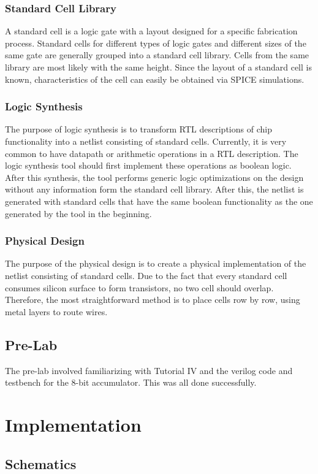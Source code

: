 \documentclass[12pt]{article}
\begin{document}
\subsubsection{Standard Cell Library}
A standard cell is a logic gate with a layout designed for a specific fabrication process. Standard cells for different types of logic gates and different sizes of the same gate are generally grouped into a standard cell library. Cells from the same library are most likely with the same height. Since the layout of a standard cell is known, characteristics of the cell can easily be obtained via SPICE simulations.
\subsubsection{Logic Synthesis}
The purpose of logic synthesis is to transform RTL descriptions of chip functionality into a netlist consisting of standard cells. Currently, it is very common to have datapath or arithmetic operations in a RTL description. The logic synthesis tool should first implement these operations as boolean logic. After this synthesis, the tool performs generic logic optimizations  on the design without any information form the standard cell library. After this, the netlist is generated with standard cells that have the same boolean functionality as the one generated by the tool in the beginning.
\subsubsection{Physical Design}
The purpose of the physical design is to create a physical implementation of the netlist consisting of standard cells. Due to the fact that every standard cell consumes silicon surface to form transistors, no two cell should overlap. Therefore, the most straightforward method is to place cells row by row, using metal layers to route wires.


\subsection{Pre-Lab}
The pre-lab involved familiarizing with Tutorial IV and the verilog code and testbench for the 8-bit accumulator. This was all done successfully.

\section{Implementation}
\subsection{Schematics}
\end{document}
